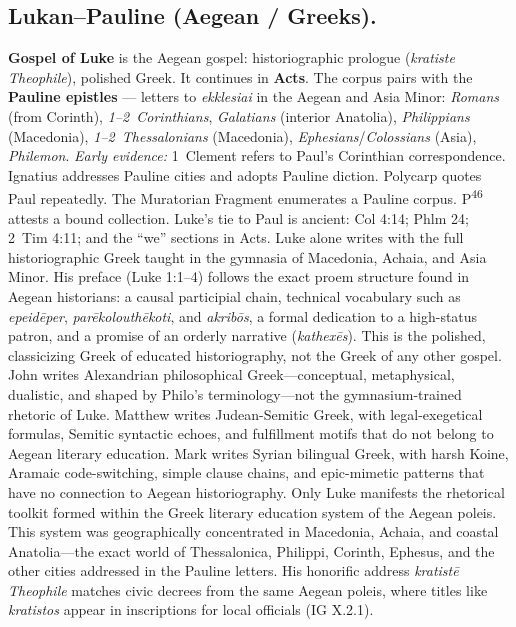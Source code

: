 \subsection{Lukan--Pauline (Aegean / Greeks).}
\textbf{Gospel of Luke} is the Aegean gospel: historiographic prologue (\textit{kratiste Theophile}), polished Greek.
It continues in \textbf{Acts}.
The corpus pairs with the \textbf{Pauline epistles} --- letters to \textit{ekklesiai} in the Aegean and Asia Minor: \textit{Romans} (from Corinth), \textit{1--2~Corinthians}, \textit{Galatians} (interior Anatolia), \textit{Philippians} (Macedonia), \textit{1--2~Thessalonians} (Macedonia), \textit{Ephesians}/\textit{Colossians} (Asia), \textit{Philemon}.
\emph{Early evidence:} 1~Clement refers to Paul’s Corinthian correspondence.
Ignatius addresses Pauline cities and adopts Pauline diction.
Polycarp quotes Paul repeatedly.
The Muratorian Fragment enumerates a Pauline corpus.
P\textsuperscript{46} attests a bound collection.
Luke's tie to Paul is ancient: Col 4:14; Phlm 24; 2~Tim 4:11; and the ``we'' sections in Acts.
Luke alone writes with the full historiographic Greek taught in the gymnasia of Macedonia, Achaia, and Asia Minor.
His preface (Luke 1:1--4) follows the exact proem structure found in Aegean historians: a causal participial chain, technical vocabulary such as \textit{epeidēper}, \textit{parēkolouthēkoti}, and \textit{akribōs}, a formal dedication to a high-status patron, and a promise of an orderly narrative (\textit{kathexēs}).
This is the polished, classicizing Greek of educated historiography, not the Greek of any other gospel.
John writes Alexandrian philosophical Greek---conceptual, metaphysical, dualistic, and shaped by Philo's terminology---not the gymnasium-trained rhetoric of Luke.
Matthew writes Judean-Semitic Greek, with legal-exegetical formulas, Semitic syntactic echoes, and fulfillment motifs that do not belong to Aegean literary education.
Mark writes Syrian bilingual Greek, with harsh Koine, Aramaic code-switching, simple clause chains, and epic-mimetic patterns that have no connection to Aegean historiography.
Only Luke manifests the rhetorical toolkit formed within the Greek literary education system of the Aegean poleis.
This system was geographically concentrated in Macedonia, Achaia, and coastal Anatolia---the exact world of Thessalonica, Philippi, Corinth, Ephesus, and the other cities addressed in the Pauline letters.
His honorific address \textit{kratistē Theophile} matches civic decrees from the same Aegean poleis, where titles like \textit{kratistos} appear in inscriptions for local officials (IG X.2.1).

